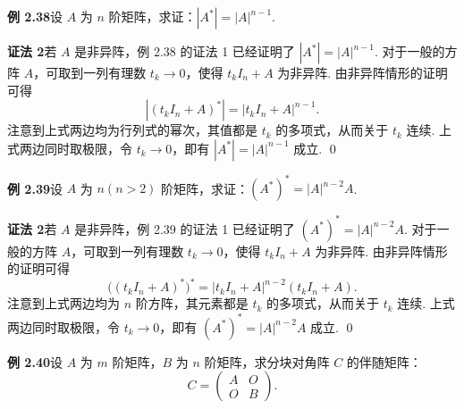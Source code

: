 \documentclass[UTF8,12pt,a4paper,fontset=fandol]{ctexart}
\begin{document}
\noindent\textbf{例 2.38}\quad 设 $A$ 为 $n$ 阶矩阵，求证：$|A^*|=|A|^{n-1}$.

\noindent\textbf{证法 2}\quad 若 $A$ 是非异阵，例 2.38 的证法 1 已经证明了 $|A^*|=|A|^{n-1}$. 对于一般的方阵 $A$，可取到一列有理数 $t_k\to0$，使得 $t_kI_n+A$ 为非异阵. 由非异阵情形的证明可得
\[
|(t_kI_n+A)^*|=|t_kI_n+A|^{n-1}.
\]
注意到上式两边均为行列式的幂次，其值都是 $t_k$ 的多项式，从而关于 $t_k$ 连续. 上式两边同时取极限，令 $t_k\to0$，即有 $|A^*|=|A|^{n-1}$ 成立. \qed

\noindent\textbf{例 2.39}\quad 设 $A$ 为 $n(n>2)$ 阶矩阵，求证：$(A^*)^*=|A|^{n-2}A$.

\noindent\textbf{证法 2}\quad 若 $A$ 是非异阵，例 2.39 的证法 1 已经证明了 $(A^*)^*=|A|^{n-2}A$. 对于一般的方阵 $A$，可取到一列有理数 $t_k\to0$，使得 $t_kI_n+A$ 为非异阵. 由非异阵情形的证明可得
\[
\bigl((t_kI_n+A)^*\bigr)^*=|t_kI_n+A|^{n-2}(t_kI_n+A).
\]
注意到上式两边均为 $n$ 阶方阵，其元素都是 $t_k$ 的多项式，从而关于 $t_k$ 连续. 上式两边同时取极限，令 $t_k\to0$，即有 $(A^*)^*=|A|^{n-2}A$ 成立. \qed

\noindent\textbf{例 2.40}\quad 设 $A$ 为 $m$ 阶矩阵，$B$ 为 $n$ 阶矩阵，求分块对角阵 $C$ 的伴随矩阵：
\[
C=
\left(
\begin{array}{cc}
A & O\\
O & B
\end{array}
\right).
\]
\end{document}
